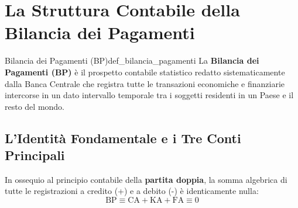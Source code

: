 \section{La Struttura Contabile della Bilancia dei Pagamenti}

\begin{definizione}{Bilancia dei Pagamenti (BP)}{def_bilancia_pagamenti}
La \textbf{Bilancia dei Pagamenti (BP)} è il prospetto contabile statistico redatto sistematicamente dalla Banca Centrale che registra tutte le transazioni economiche e finanziarie intercorse in un dato intervallo temporale tra i soggetti residenti in un Paese e il resto del mondo.
\end{definizione}

\subsection{L'Identità Fondamentale e i Tre Conti Principali}
In ossequio al principio contabile della \textbf{partita doppia}, la somma algebrica di tutte le registrazioni a credito (+) e a debito (-) è identicamente nulla:
\begin{equation}
    \mathrm{BP} \equiv \mathrm{CA} + \mathrm{KA} + \mathrm{FA} \equiv 0 \label{eq:bp_identita}
\end{equation}

